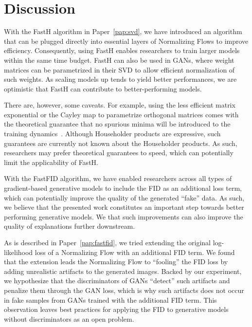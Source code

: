 \documentclass[11pt,a4paper,twoside,openright,final]{memoir}
\newcommand*{\paperref}[1]{Paper~\hyperref[#1]{\ref{#1}}}
\begin{document}
 
\section{Discussion}\label{sec:nn-discussion}

With the FastH algorithm in \paperref{pap:svd}, we have introduced an algorithm that can be plugged directly into essential layers of Normalizing Flows to improve efficiency.
Consequently, using FastH enables researchers to train larger models within the same time budget.
FastH can also be used in GANs, where weight matrices can be parametrized in their SVD to allow efficient normalization of such weights.
As scaling models up tends to yield better performances, we are optimistic that FastH can contribute to better-performing models.

There are, however, some caveats. 
For example, using the less efficient matrix exponential or the Cayley map to parametrize orthogonal matrices comes with the theoretical guarantee that no spurious minima will be introduced to the training dynamics~\cite{matrixexp1}.  
Although Householder products are expressive, such guarantees are currently not known about the Householder products. 
As such, researchers may prefer theoretical guarantees to speed, which can potentially limit the applicability of FastH.

With the FastFID algorithm, we have enabled researchers across all types of gradient-based generative models to include the FID as an additional loss term, which can potentially improve the quality of the generated ``fake'' data.
As such, we believe that the presented work constitutes an important step towards better performing generative models.
We that such improvements can also improve the quality of explanations further downstream. 

As is described in \paperref{pap:fastfid}, we tried extending the original log-likelihood loss of a Normalizing Flow with an additional FID term.
We found that the extension leads the Normalizing Flow to ``fooling'' the FID loss by adding unrealistic artifacts to the generated images. 
Backed by our experiment, we hypothesize that the discriminators of GANs ``detect'' such artifacts and penalize them through the GAN loss, which is why such artifacts does not occur in fake samples from GANs trained with the additional FID term.
This observation leaves best practices for applying the FID to generative models without discriminators as an open problem.
\end{document}
